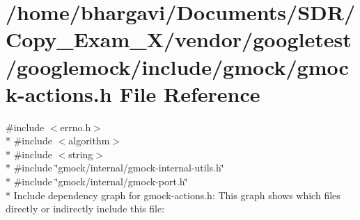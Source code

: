 \hypertarget{gmock-actions_8h}{}\section{/home/bhargavi/\+Documents/\+S\+D\+R/\+Copy\+\_\+\+Exam\+\_\+X/vendor/googletest/googlemock/include/gmock/gmock-\/actions.h File Reference}
\label{gmock-actions_8h}
{\ttfamily \#include $<$errno.\+h$>$}\\*
{\ttfamily \#include $<$algorithm$>$}\\*
{\ttfamily \#include $<$string$>$}\\*
{\ttfamily \#include \char`\"{}gmock/internal/gmock-\/internal-\/utils.\+h\char`\"{}}\\*
{\ttfamily \#include \char`\"{}gmock/internal/gmock-\/port.\+h\char`\"{}}\\*
Include dependency graph for gmock-\/actions.h\+:
This graph shows which files directly or indirectly include this file\+:
